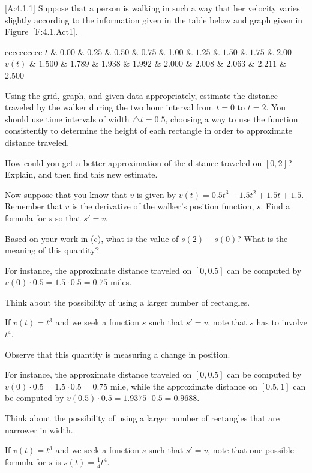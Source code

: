 {[}A:4.1.1{]} Suppose that a person is walking in such a way that her
velocity varies slightly according to the information given in the table
below and graph given in Figure~{[}F:4.1.Act1{]}.

{c\textbar{}c\textbar{}c\textbar{}c\textbar{}c\textbar{}c\textbar{}c\textbar{}c\textbar{}c\textbar{}c}
\(t\) \& 0.00 \& \(0.25\) \& \(0.50\) \& \(0.75\) \& 1.00 \& \(1.25\) \&
\(1.50\) \& \(1.75\) \& \(2.00\) ~\(v(t)\) \& \(1.500\) \& \(1.789\) \&
\(1.938\) \& \(1.992\) \& \(2.000\) \& \(2.008\) \& \(2.063\) \&
\(2.211\) \& \(2.500\) ~

Using the grid, graph, and given data appropriately, estimate the
distance traveled by the walker during the two hour interval from
\(t = 0\) to \(t = 2\). You should use time intervals of width
\(\triangle t = 0.5\), choosing a way to use the function consistently
to determine the height of each rectangle in order to approximate
distance traveled.

How could you get a better approximation of the distance traveled on
\([0,2]\)? Explain, and then find this new estimate.

Now suppose that you know that \(v\) is given by
\(v(t) = 0.5t^3-1.5t^2+1.5t+1.5\). Remember that \(v\) is the derivative
of the walker's position function, \(s\). Find a formula for \(s\) so
that \(s' = v\).

Based on your work in (c), what is the value of \(s(2) - s(0)\)? What is
the meaning of this quantity?

For instance, the approximate distance traveled on \([0,0.5]\) can be
computed by \(v(0) \cdot 0.5 = 1.5 \cdot 0.5 = 0.75\) miles.

Think about the possibility of using a larger number of rectangles.

If \(v(t) = t^3\) and we seek a function \(s\) such that \(s' = v\),
note that \(s\) has to involve \(t^4\).

Observe that this quantity is measuring a change in position.

For instance, the approximate distance traveled on \([0,0.5]\) can be
computed by \(v(0) \cdot 0.5 = 1.5 \cdot 0.5 = 0.75\) mile, while the
approximate distance on \([0.5,1]\) can be computed by
\(v(0.5) \cdot 0.5 = 1.9375 \cdot 0.5 = 0.9688\).

Think about the possibility of using a larger number of rectangles that
are narrower in width.

If \(v(t) = t^3\) and we seek a function \(s\) such that \(s' = v\),
note that one possible formula for \(s\) is \(s(t) = \frac{1}{4}t^4\).

